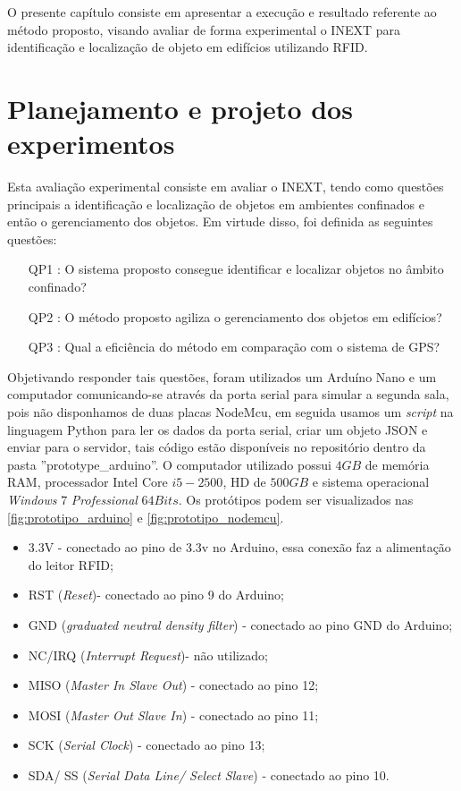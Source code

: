 \label{chapter:resultados}
O presente capítulo consiste em apresentar a execução e resultado referente ao método proposto, visando avaliar de forma experimental o INEXT para identificação e localização de objeto em edifícios utilizando RFID.

\section{Planejamento e projeto dos experimentos}
Esta avaliação experimental consiste em avaliar o INEXT, tendo como questões principais a identificação e localização de objetos em ambientes confinados e então o gerenciamento dos objetos. Em virtude disso, foi definida as seguintes questões:
\begin{itemize}
    \item[QP1]: O sistema proposto consegue identificar e localizar objetos no âmbito confinado?
    \item[QP2]: O método proposto agiliza o gerenciamento dos objetos em edifícios?
    \item[QP3]: Qual a eficiência do método em comparação com o sistema de GPS?
\end{itemize}{}
\par 
Objetivando responder tais questões, foram utilizados um Arduíno Nano e um computador comunicando-se através da porta serial para simular a segunda sala, pois não disponhamos de duas placas NodeMcu, em seguida usamos um \textit{script} na linguagem Python para ler os dados da porta serial, criar um objeto JSON e enviar para o servidor, tais código estão disponíveis no repositório dentro da pasta ''prototype\_arduino''. O computador utilizado possui $4GB$ de memória RAM, processador Intel Core $i5-2500$, HD de $500GB$ e sistema operacional \textit{Windows} $7$ \textit{Professional} $64Bits$.  Os protótipos podem ser visualizados nas \autoref{fig:prototipo_arduino} e \autoref{fig:prototipo_nodemcu}. 

\begin{itemize}
    \item 3.3V - conectado ao pino de 3.3v no Arduino, essa conexão faz a alimentação do leitor RFID;
    \item RST (\textit{Reset})- conectado ao pino 9 do Arduino;
    \item GND (\textit{graduated neutral density filter}) - conectado ao pino GND do Arduino;
    \item NC/IRQ (\textit{Interrupt Request})- não utilizado;
    \item MISO (\textit{Master In Slave Out}) - conectado ao pino 12;
    \item MOSI  (\textit{Master Out Slave In}) - conectado ao pino 11;
    \item SCK  (\textit{Serial Clock}) - conectado ao pino 13;
    \item SDA/ SS (\textit{Serial Data Line/ Select Slave}) - conectado ao pino 10.
\end{itemize}    

